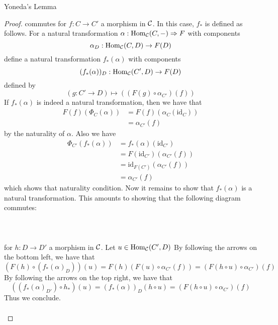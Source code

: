 \documentclass[a4paper]{article}
\begin{document}
\begin{thm}{Yoneda's Lemma}{}
\begin{proof}
commutes for $f:C\to C'$ a morphism in $\mathcal{C}$. In this case, $f_\ast$ is defined as follows. For a natural transformation $\alpha:\operatorname{Hom}_{\mathcal{C}}(C,-)\Rightarrow F$ with components $$\alpha_D:\operatorname{Hom}_{\mathcal{C}}(C,D)\to F(D)$$ define a natural transformation $f_\ast(\alpha)$ with components $$(f_\ast(\alpha))_D:\operatorname{Hom}_{\mathcal{C}}(C',D)\to F(D)$$ defined by $$(g:C'\to D)\mapsto\left((F(g)\circ\alpha_{C'})(f)\right)$$ If $f_\ast(\alpha)$ is indeed a natural transformation, then we have that 
\begin{align*}
F(f)(\Phi_C(\alpha))&=F(f)(\alpha_C(\text{id}_C))\\
&=\alpha_{C'}(f)
\end{align*}
by the naturality of $\alpha$. Also we have 
\begin{align*}
\Phi_{C'}(f_\ast(\alpha))&=f_\ast(\alpha)(\text{id}_{C'})\\
&=F(\text{id}_{C'})(\alpha_{C'}(f))\\
&=\text{id}_{F(C')}(\alpha_{C'}(f))\\
&=\alpha_{C'}(f)
\end{align*}
which shows that naturality condition. Now it remains to show that $f_\ast(\alpha)$ is a natural transformation. This amounts to showing that the following diagram commutes: \\~\\
\\~\\
for $h:D\to D'$ a morphism in $\mathcal{C}$. Let $u\in\operatorname{Hom}_{\mathcal{C}}(C',D)$ By following the arrows on the bottom left, we have that $$(F(h)\circ(f_\ast(\alpha)_D))(u)=F(h)\left(F(u)\circ\alpha_{C'}(f)\right)=\left(F(h\circ u)\circ\alpha_{C'}\right)(f)$$ By following the arrows on the top right, we have that $$((f_\ast(\alpha)_{D'})\circ h_\ast)(u)=(f_\ast(\alpha))_D(h\circ u)=\left(F(h\circ u)\circ\alpha_{C'}\right)(f)$$ Thus we conclude. \\~\\


\end{proof}
\end{thm}
\end{document}
